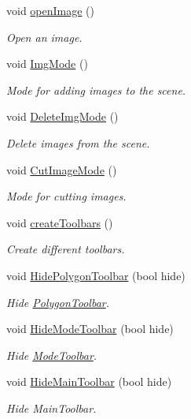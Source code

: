 \begin{DoxyCompactItemize}
void \mbox{\hyperlink{classGUI_a925c89bd7b32ccc8d726063ed8076f8f}{open\+Image}} ()
\begin{DoxyCompactList}\small\item\em Open an image. \end{DoxyCompactList}\item 
void \mbox{\hyperlink{classGUI_a5281fa4256d3ff14df9a95c1c6613bb2}{Img\+Mode}} ()
\begin{DoxyCompactList}\small\item\em Mode for adding images to the scene. \end{DoxyCompactList}\item 
void \mbox{\hyperlink{classGUI_a453b758a292b4a0e6f52f25b1bb2de77}{Delete\+Img\+Mode}} ()
\begin{DoxyCompactList}\small\item\em Delete images from the scene. \end{DoxyCompactList}\item 
void \mbox{\hyperlink{classGUI_ae8acfcce2ea4da241c920076b72f1c93}{Cut\+Image\+Mode}} ()
\begin{DoxyCompactList}\small\item\em Mode for cutting images. \end{DoxyCompactList}\item 
void \mbox{\hyperlink{classGUI_a26cdc4a989f3637301f0afb9cc5e23b0}{create\+Toolbars}} ()
\begin{DoxyCompactList}\small\item\em Create different toolbars. \end{DoxyCompactList}\item 
void \mbox{\hyperlink{classGUI_aaf633cd0904e4c3627c21219f330c177}{Hide\+Polygon\+Toolbar}} (bool hide)
\begin{DoxyCompactList}\small\item\em Hide \mbox{\hyperlink{structPolygonToolbar}{Polygon\+Toolbar}}. \end{DoxyCompactList}\item 
void \mbox{\hyperlink{classGUI_a9517c0ad1e4c2b39faab8050f8133151}{Hide\+Mode\+Toolbar}} (bool hide)
\begin{DoxyCompactList}\small\item\em Hide \mbox{\hyperlink{structModeToolbar}{Mode\+Toolbar}}. \end{DoxyCompactList}\item 
void \mbox{\hyperlink{classGUI_aa115b0163bfbf518dd201f4f02476b75}{Hide\+Main\+Toolbar}} (bool hide)
\begin{DoxyCompactList}\small\item\em Hide Main\+Toolbar. \end{DoxyCompactList}\item 

\end{DoxyCompactItemize}
